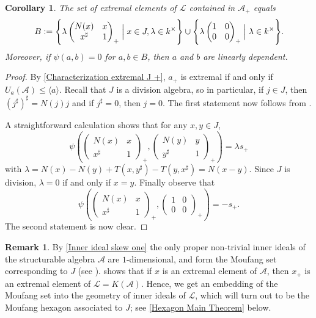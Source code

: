 \documentclass[oneside,a4paper]{amsart} %
\newtheorem{corollary}[theorem]{Corollary}
\theoremstyle{definition}
\newtheorem{remark}[theorem]{Remark}
\newcommand{\A}{\mathcal{A}}
\newcommand{\LL}{\mathcal{L}}
\numberwithin{equation}{section}
\begin{document}
\begin{corollary}
\label{Extremal J_+ explicit}
	The set of extremal elements of $\LL$ contained in $\A_+$ equals 
	\[B:=\Biggl \{\lambda \begin{pmatrix} N(x) & x \\ x^\sharp & 1 \end{pmatrix} _+ \Bigm\vert x\in J, \lambda\in k^\times\Biggr\} \cup \Biggl \{ \lambda\begin{pmatrix} 1 & 0 \\ 0 & 0 \end{pmatrix} _+ \Bigm\vert \lambda\in k^\times\Biggr \} .\]
	Moreover, if $\psi(a,b)=0$ for $a,b \in B$, then $a$ and $b$ are linearly dependent.
\end{corollary}
\begin{proof}
	By \cref{Characterization extremal J +}, $a_+$ is extremal if and only if $U_a(\A)\leq \langle a\rangle$.
	Recall that $J$ is a division algebra, so in particular, if $j \in J$, then $(j^\sharp)^\sharp = N(j) j$ and if $j^\sharp=0$, then $j=0$.
	The first statement now follows from \cite[Lemma 5.7]{Garibaldi2001}.
	
	A straightforward calculation shows that for any $x,y\in J$,
	\[ \psi \left( \begin{pmatrix} N(x) & x \\ x^\sharp & 1 \end{pmatrix}_+ , \begin{pmatrix} N(y) & y \\ y^\sharp & 1 \end{pmatrix}_+ \right) = \lambda s_+ \]
	with $\lambda=N(x)-N(y)+T(x,y^\sharp)-T(y,x^\sharp)=N(x-y)$.
	Since $J$ is division, $\lambda=0$ if and only if $x=y$.
	Finally observe that
	\[ \psi \left( \begin{pmatrix} N(x) & x \\ x^\sharp & 1 \end{pmatrix}_+ , \begin{pmatrix} 1 & 0 \\ 0 & 0 \end{pmatrix}_+\right) = -s_+.\]
	The second statement is now clear.
\end{proof}

\begin{remark}
\label{Hexagon embedding Moufang set}
	By \cref{Inner ideal skew one} the only proper non-trivial
	inner ideals of the structurable algebra $\A$ are $1$-dimensional, and form the Moufang set corresponding to $J$ (see \cite{DeMedts2020}).
	 shows that if $x$ is an extremal element of $\A$, then $x_+$ is an extremal element of $\LL=K(\A)$. 
	Hence, we get an embedding of the Moufang set into the geometry of inner ideals of $\LL$, which will turn out to be the Moufang hexagon associated to $J$; see \cref{Hexagon Main Theorem} below.
\end{remark}
\end{document}
